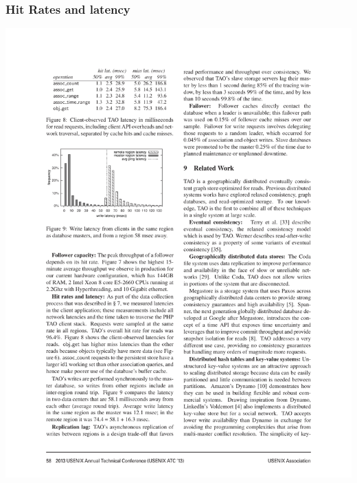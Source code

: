 \begin{frame}[c]\frametitle{Hit Rates and latency}
\centering
\includegraphics[width=\textwidth]{figs/table8.pdf} 

\end{frame}

